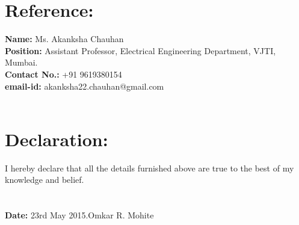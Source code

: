 \documentclass[a4 paper,12pt]{article}
\begin{document}
\begin{minipage}{0.98\textwidth}
	\section{Reference:}
	\vspace{-0.1in}
	\textbf{Name:} Ms. Akanksha Chauhan\\\textbf{Position:} Assistant Professor, Electrical Engineering Department, VJTI, Mumbai.\\\textbf{Contact No.:} +91 9619380154\\\textbf{email-id:} akanksha22.chauhan@gmail.com\\\\
\end{minipage}

\begin{minipage}{0.98\textwidth}
	\section{Declaration:}
	\vspace{-0.1in}
	I hereby declare that all the details furnished above are true to the best of my knowledge and belief.\\\\\\\textbf{Date:} 23rd May 2015.\hfill Omkar R. Mohite\\
\end{minipage}
\end{document}
